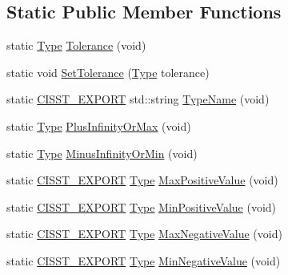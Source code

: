 \subsection*{Static Public Member Functions}
\begin{DoxyCompactItemize}
\item 
static \hyperlink{classcmn_type_traits_aefe66f235207b010b396b5558529a1da}{Type} \hyperlink{classcmn_type_traits_adc129bf9867295b90d300768b780fa99}{Tolerance} (void)
\item 
static void \hyperlink{classcmn_type_traits_a69fc7819cca0dc236e0986a2279752bb}{Set\+Tolerance} (\hyperlink{classcmn_type_traits_aefe66f235207b010b396b5558529a1da}{Type} tolerance)
\item 
static \hyperlink{cmn_export_macros_8h_a99393e0c3ac434b2605235bbe20684f8}{C\+I\+S\+S\+T\+\_\+\+E\+X\+P\+O\+R\+T} std\+::string \hyperlink{classcmn_type_traits_a6c47af27fd91c3b676389447c746c348}{Type\+Name} (void)
\item 
static \hyperlink{classcmn_type_traits_aefe66f235207b010b396b5558529a1da}{Type} \hyperlink{classcmn_type_traits_a0ee3b17c98d4ab75132a59601468c7e8}{Plus\+Infinity\+Or\+Max} (void)
\item 
static \hyperlink{classcmn_type_traits_aefe66f235207b010b396b5558529a1da}{Type} \hyperlink{classcmn_type_traits_afe6bf0685eb634e6982a7ae0c7d3333b}{Minus\+Infinity\+Or\+Min} (void)
\item 
static \hyperlink{cmn_export_macros_8h_a99393e0c3ac434b2605235bbe20684f8}{C\+I\+S\+S\+T\+\_\+\+E\+X\+P\+O\+R\+T} \hyperlink{classcmn_type_traits_aefe66f235207b010b396b5558529a1da}{Type} \hyperlink{classcmn_type_traits_a7722da6e6b3848f513ccd27ba66db533}{Max\+Positive\+Value} (void)
\item 
static \hyperlink{cmn_export_macros_8h_a99393e0c3ac434b2605235bbe20684f8}{C\+I\+S\+S\+T\+\_\+\+E\+X\+P\+O\+R\+T} \hyperlink{classcmn_type_traits_aefe66f235207b010b396b5558529a1da}{Type} \hyperlink{classcmn_type_traits_a77e9c73609fea51d7e1ee282899c9f5c}{Min\+Positive\+Value} (void)
\item 
static \hyperlink{cmn_export_macros_8h_a99393e0c3ac434b2605235bbe20684f8}{C\+I\+S\+S\+T\+\_\+\+E\+X\+P\+O\+R\+T} \hyperlink{classcmn_type_traits_aefe66f235207b010b396b5558529a1da}{Type} \hyperlink{classcmn_type_traits_a06500a4d63c35d03b7f0c1b0dc2aba07}{Max\+Negative\+Value} (void)
\item 
static \hyperlink{cmn_export_macros_8h_a99393e0c3ac434b2605235bbe20684f8}{C\+I\+S\+S\+T\+\_\+\+E\+X\+P\+O\+R\+T} \hyperlink{classcmn_type_traits_aefe66f235207b010b396b5558529a1da}{Type} \hyperlink{classcmn_type_traits_abd691df0cb5ce7278bb33f3184300c29}{Min\+Negative\+Value} (void)

\end{DoxyCompactItemize}
